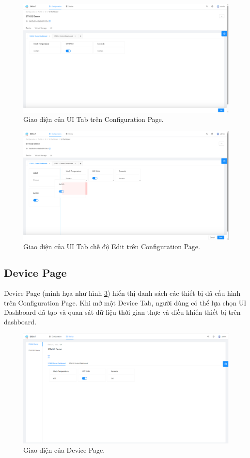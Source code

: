 \begin{figure}[htp]
\centering
\includegraphics[width=1.0\linewidth]{images/fig-config-ui-tab.png}
\caption{Giao diện của UI Tab trên Configuration Page.}
\label{fig:config-ui-tab}
\end{figure}

\begin{figure}[htp]
\centering
\includegraphics[width=1.0\linewidth]{images/fig-config-ui-tab-edit-mode.png}
\caption{Giao diện của UI Tab chế độ Edit trên Configuration Page.}
\label{fig:config-ui-tab-edit-mode}
\end{figure}

\subsection{Device Page}

Device Page (minh họa như hình \ref{fig:device-page}) hiển thị danh sách các thiết bị đã cấu hình trên Configuration Page. Khi mở một Device Tab, người dùng có thể lựa chọn UI Dashboard đã tạo và quan sát dữ liệu thời gian thực và điều khiển thiết bị trên dashboard.

\begin{figure}[htp]
\centering
\includegraphics[width=1.0\textheight,angle=90,frame]{images/fig-device-page.png}
\caption{Giao diện của Device Page.}
\label{fig:device-page}
\end{figure}